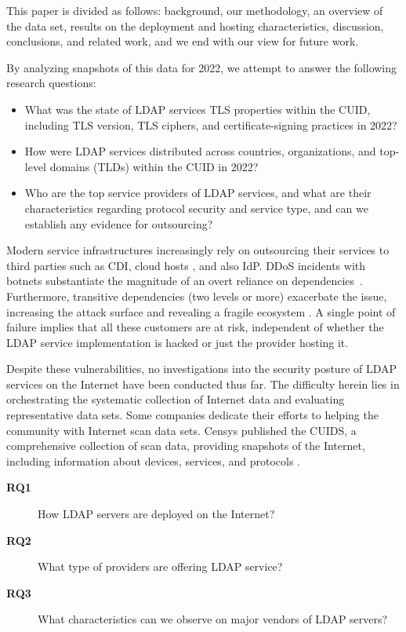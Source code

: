 \iffalse
This paper is divided as follows: background, our methodology, an overview of the data set, results on the deployment and hosting characteristics, discussion, conclusions, and related work, and we end with our view for future work.

By analyzing snapshots of this data for 2022, we attempt to answer the following research questions: 
\begin{itemize}
    \item[1:] What was the state of LDAP services TLS properties within the CUID, including TLS version, TLS ciphers, and certificate-signing practices in 2022?
    \item[2:] How were LDAP services distributed across countries, organizations, and top-level domains (TLDs) within the CUID in 2022?
    \item[3:] Who are the top service providers of LDAP services, and what are their characteristics regarding protocol security and service type, and can we establish any evidence for outsourcing? 
\end{itemize}

Modern service infrastructures increasingly rely on outsourcing their services to third parties such as \gls{CDI}, cloud hosts \cite{doan2022}, and also \gls{IdP}. DDoS incidents with botnets substantiate the magnitude of an overt reliance on dependencies~\cite{woolfDDoSAttackThat2016, Wainwright2019, GRILLENMEIER202113}. Furthermore, transitive dependencies (two levels or more) exacerbate the issue, increasing the attack surface and revealing a fragile ecosystem \cite{Kashaf2020}. A single point of failure implies that all these customers are at risk, independent of whether the LDAP service implementation is hacked or just the provider hosting it.

Despite these vulnerabilities, no investigations into the security posture of LDAP services on the Internet have been conducted thus far. The difficulty herein lies in orchestrating the systematic collection of Internet data and evaluating representative data sets. Some companies dedicate their efforts to helping the community with Internet scan data sets. Censys published the \gls{CUIDS}, a comprehensive collection of scan data, providing snapshots of the Internet, including information about devices, services, and protocols \cite{censys15}.

\begin{description}
    \item[\textbf{RQ1}] How LDAP servers are deployed on the Internet?
    \item[\textbf{RQ2}] What type of providers are offering LDAP service?
    \item[\textbf{RQ3}] What characteristics can we observe on major vendors of LDAP servers?
\end{description}

